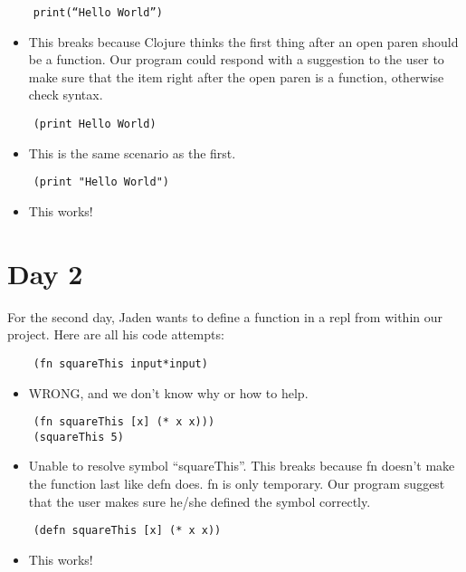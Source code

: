 \documentclass[12pt]{article}
\begin{document}
\begin{verbatim}
	print(“Hello World”)
\end{verbatim}
\begin{itemize}
	\item This breaks because Clojure thinks the first thing after an open paren should be a function. Our program could respond with a suggestion to the user to make sure that the item right after the open paren is a function, otherwise check syntax. 
\end{itemize}

\begin{verbatim}
	(print Hello World)
\end{verbatim}
\begin{itemize}
	\item This is the same scenario as the first.
\end{itemize}

\begin{verbatim}
	(print "Hello World")
\end{verbatim}
\begin{itemize}
	\item This works!
\end{itemize}

\section{Day 2}
For the second day, Jaden wants to define a function in a repl from within our project. Here are all his code attempts:

\begin{verbatim}
	(fn squareThis input*input)
\end{verbatim}
\begin{itemize}
	\item WRONG, and we don’t know why or how to help.
\end{itemize}

\begin{verbatim}
	(fn squareThis [x] (* x x)))
	(squareThis 5)
\end{verbatim}
\begin{itemize}
	\item Unable to resolve symbol “squareThis”. This breaks because fn doesn’t make the function last like defn does. fn is only temporary. Our program suggest that the user makes sure he/she defined the symbol correctly.
\end{itemize}

\begin{verbatim}
	(defn squareThis [x] (* x x))
\end{verbatim}
\begin{itemize}
	\item This works!
\end{itemize}
\end{document}
